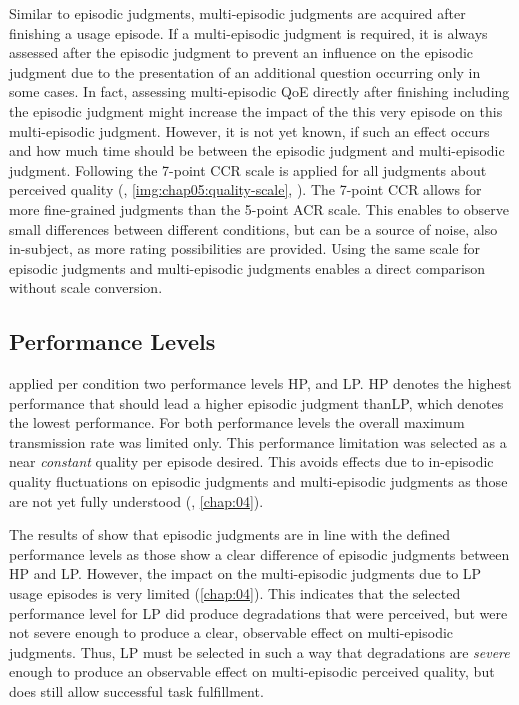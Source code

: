 Similar to episodic judgments, multi-episodic judgments are acquired after finishing a usage episode.
If a multi-episodic judgment is required, it is always assessed after the episodic judgment to prevent an influence on the episodic judgment due to the presentation of an additional question occurring only in some cases.
In fact, assessing multi-episodic \ac{QoE} directly after finishing including the episodic judgment might increase the impact of the this very episode on this multi-episodic judgment.
However, it is not yet known, if such an effect occurs and how much time should be between the episodic judgment and multi-episodic judgment.
Following \citet{moller_single-call_2011} the 7-point \ac{CCR} scale is applied for all judgments about perceived quality (\cf, \autoref{img:chap05:quality-scale}, ).
The 7-point \ac{CCR} allows for more fine-grained judgments than the 5-point \ac{ACR} scale.
This enables to observe small differences between different conditions, but can be a source of noise, also in-subject, as more rating possibilities are provided.
Using the same scale for episodic judgments and multi-episodic judgments enables a direct comparison without scale conversion.

\subsection{Performance Levels}
\citet{moller_single-call_2011} applied per condition two performance levels \acf{HP}, and \acf{LP}.
\ac{HP} denotes the highest performance that should lead a higher episodic judgment than\ac{LP}, which denotes the lowest performance.
For both performance levels the overall maximum transmission rate was limited only.
This performance limitation was selected as a near \emph{constant} quality per episode desired. %
This avoids effects due to in-episodic quality fluctuations on episodic judgments and multi-episodic judgments as those are not yet fully understood (\cf, \autoref{chap:04}).

The results of \cite{moller_single-call_2011} show that episodic judgments are in line with the defined performance levels as those show a clear difference of episodic judgments between \ac{HP} and \ac{LP}.
However, the impact on the multi-episodic judgments due to \ac{LP} usage episodes is very limited (\cf \autoref{chap:04}).
This indicates that the selected performance level for \ac{LP} did produce degradations that were perceived, but were not severe enough to produce a clear, observable effect on multi-episodic judgments.
Thus, \ac{LP} must be selected in such a way that degradations are \emph{severe} enough to produce an observable effect on multi-episodic perceived quality, but does still allow successful task fulfillment.

